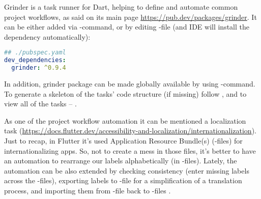Grinder is a task runner for Dart, helping to define and automate common project workflows, as said on its main page
\href{https://pub.dev/packages/grinder}{https://pub.dev/packages/grinder}.  It can be either added via -command, or by editing -file  (and IDE will install the dependency automatically):

\begin{lstlisting}[language=yaml]
## ./pubspec.yaml
dev_dependencies:
  grinder: ^0.9.4
\end{lstlisting}

\noindent In addition, grinder package can be made globally available by using -command.
To generate a skeleton of the tasks' code structure (if missing) follow , and to view all of 
the tasks -- .

As one of the project workflow automation it can be mentioned a localization task
(\href{https://docs.flutter.dev/accessibility-and-localization/internationalization}{https://docs.flutter.dev/accessibility-and-localization/internationalization}).
Just to recap, in Flutter it's used Application Resource Bundle(s) (-files) for internationalizing apps.
So, not to create a mess in those files, it's better to have an automation to rearrange our labels alphabetically
(in -files). Lately, the automation can be also extended by checking consistency (enter missing
labels across the -files), exporting labels to -file for a simplification of a translation process, and
importing them from -file back to -files .

